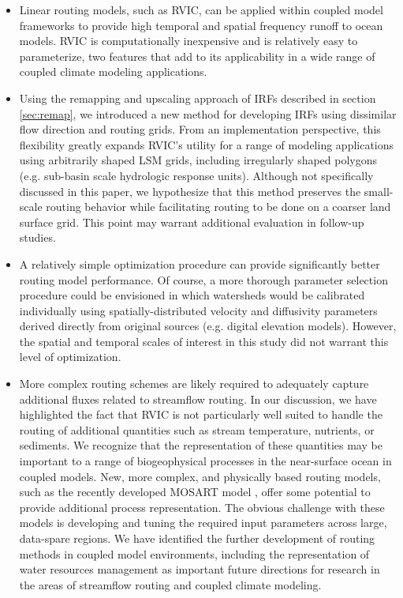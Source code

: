 \documentclass[jgrga, draft]{agutex}
\begin{document}
\begin{article}
\begin{itemize}[leftmargin=+.5in]
  \item Linear routing models, such as RVIC, can be applied within coupled model frameworks to provide high temporal and spatial frequency runoff to ocean models.
  RVIC is computationally inexpensive and is relatively easy to parameterize, two features that add to its applicability in a wide range of coupled climate modeling applications.
  \item Using the remapping and upscaling approach of IRFs described in section \ref{sec:remap}, we introduced a new method for developing IRFs using dissimilar flow direction and routing grids.
  From an implementation perspective, this flexibility greatly expands RVIC's utility for a range of modeling applications using arbitrarily shaped LSM grids, including irregularly shaped polygons (e.g. sub-basin scale hydrologic response units).
  Although not specifically discussed in this paper, we hypothesize that this method preserves the small-scale routing behavior while facilitating routing to be done on a coarser land surface grid.
  This point may warrant additional evaluation in follow-up studies.
  \item A relatively simple optimization procedure can provide significantly better routing model performance.
  Of course, a more thorough parameter selection procedure could be envisioned in which watersheds would be calibrated individually using spatially-distributed velocity and diffusivity parameters derived directly from original sources (e.g. digital elevation models).
  However, the spatial and temporal scales of interest in this study did not warrant this level of optimization.
  \item More complex routing schemes are likely required to adequately capture additional fluxes related to streamflow routing.
  In our discussion, we have highlighted the fact that RVIC is not particularly well suited to handle the routing of additional quantities such as stream temperature, nutrients, or sediments.
  We recognize that the representation of these quantities may be important to a range of biogeophysical processes in the near-surface ocean in coupled models.
  New, more complex, and physically based routing models, such as the recently developed MOSART model \citep{Li_2013}, offer some potential to provide additional process representation.
  The obvious challenge with these models is developing and tuning the required input parameters across large, data-spare regions.
  We have identified the further development of routing methods in coupled model environments, including the representation of water resources management as important future directions for research in the areas of streamflow routing and coupled climate modeling.

\end{itemize}
\end{article}
\end{document}
